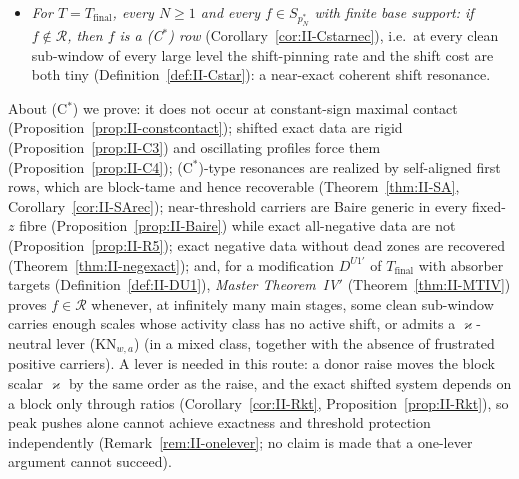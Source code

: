\documentclass[10pt]{amsart}
\theoremstyle{definition}
\theoremstyle{remark}
\newcommand{\Rec}{\mathcal R}
\begin{document}
\begin{itemize}
\item[] \emph{For $T=T_{\mathrm{final}}$, every $N\ge1$ and every $f\in
S_{p_N^*}$ with finite base support: if $f\notin\Rec$, then $f$ is a
\textup{(C$^*$)} row} (Corollary~\ref{cor:II-Cstarnec}), i.e.\ at every
clean sub-window of every large level the shift-pinning rate and the shift
cost are both tiny (Definition~\ref{def:II-Cstar}): a near-exact coherent
shift resonance.
\end{itemize}

About (C$^*$) we prove: it does not occur at constant-sign maximal contact
(Proposition~\ref{prop:II-constcontact}); shifted exact data are rigid
(Proposition~\ref{prop:II-C3}) and oscillating profiles force them
(Proposition~\ref{prop:II-C4}); (C$^*$)-type resonances are realized by
self-aligned first rows, which are block-tame and hence recoverable
(Theorem~\ref{thm:II-SA}, Corollary~\ref{cor:II-SArec}); near-threshold
carriers are Baire generic in every fixed-$z$ fibre
(Proposition~\ref{prop:II-Baire}) while exact all-negative data are not
(Proposition~\ref{prop:II-R5}); exact negative data without dead zones are
recovered (Theorem~\ref{thm:II-negexact}); and, for a modification
$D^{U1'}$ of $T_{\mathrm{final}}$ with absorber targets
(Definition~\ref{def:II-DU1}), \emph{Master Theorem~IV$'$}
(Theorem~\ref{thm:II-MTIV}) proves $f\in\Rec$ whenever, at infinitely many
main stages, some clean sub-window carries enough scales whose activity
class has no active shift, or admits a $\varkappa$-neutral lever
(KN$_{w,a}$) (in a mixed class, together with the absence of frustrated
positive carriers).
A lever is needed in this route: a donor raise moves the block scalar
$\varkappa$ by the same order as the raise, and the exact shifted system
depends on a block only through ratios (Corollary~\ref{cor:II-Rkt},
Proposition~\ref{prop:II-Rkt}), so peak pushes alone cannot achieve
exactness and threshold protection independently
(Remark~\ref{rem:II-onelever}; no claim is made that a one-lever argument
cannot succeed).
\end{document}
